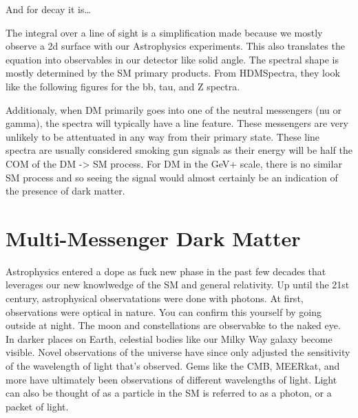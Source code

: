
And for decay it is\dots



The integral over a line of sight is a simplification made because we mostly observe a 2d surface with our Astrophysics experiments.
This also translates the equation into observables in our detector like solid angle.
The spectral shape is mostly determined by the SM primary products.
From HDMSpectra, they look like the following figures for the bb, tau, and Z spectra.


Additionaly, when DM primarily goes into one of the neutral messengers (nu or gamma), the spectra will typically have a line feature.
These messengers are very unlikely to be attentuated in any way from their primary state.
These line spectra are usually considered smoking gun signals as their energy will be half the COM of the DM -> SM process.
For DM in the GeV+ scale, there is no similar SM process and so seeing the signal would almost certainly be an indication of the presence of dark matter.


\section{Multi-Messenger Dark Matter \label{sec:mult-messengerDM}}

Astrophysics entered a dope as fuck new phase in the past few decades that leverages our new knowlwedge of the SM and general relativity.
Up until the 21st century, astrophysical observatations were done with photons.
At first, observations were optical in nature.
You can confirm this yourself by going outside at night.
The moon and constellations are observabke to the naked eye.
In darker places on Earth, celestial bodies like our Milky Way galaxy become visible.
Novel observations of the universe have since only adjusted the sensitivity of the wavelength of light that's observed.
Gems like the CMB, MEERkat, \ns and more have ultimately been observations of different wavelengths of light.
Light can also be thought of as a particle in the SM is referred to as a photon, or a packet of light.

